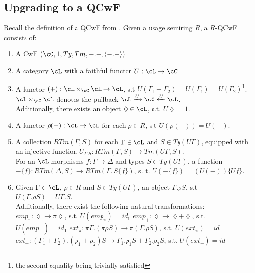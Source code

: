 \documentclass[12pt,a4paper]{article}
\begin{document}
\subsection*{Upgrading to a QCwF}
Recall the definition of a QCwF from \cite{Atkey2018}.
Given a usage semiring $R$, a $R$-QCwF consists of:
\begin{enumerate}[noitemsep]
  \item A CwF $(\cC, 1, Ty, Tm, -.-, \langle-.-\rangle)$
  
  \item A category $\cL$ with a faithful functor $U : \cL \to \cC$
  
  \item A functor $(+) : \cL \times_\cC \cL \to \cL$, s.t $U(\Gamma_1 + \Gamma_2) = U(\Gamma_1) = U(\Gamma_2)$\footnote{the second equality being trivially satisfied}. $\cL \times_\cC \cL$ denotes the pullback $\cL \xrightarrow{U} \cC \xleftarrow{U} \cL$.\\
  Additionally, there exists an object $\lozenge \in \cL$, s.t. $U\lozenge = 1$.
  
  \item A functor $\rho(-): \cL \to \cL$ for each $\rho \in R$, s.t $U(\rho(-)) = U(-)$.
  
  \item A collection $RTm(\Gamma, S)$ for each $\Gamma \in \cL$ and $S \in Ty(U\Gamma)$, equipped with an injective function $U_{\Gamma.S} : RTm(\Gamma, S) \to Tm(U\Gamma, S)$.\\
  For an $\cL$ morphisms $f: \Gamma \to \Delta$ and types $S \in Ty(U\Gamma)$, a function $-\{f\} : RTm(\Delta, S) \to RTm(\Gamma, S\{f\})$, s. t. $U(-\{f\}) = (U(-))\{Uf\}$.
         
  \item Given $\Gamma \in \cL$, $\rho \in R$ and $S \in Ty(U\Gamma)$, an object $\Gamma. \rho S$, s.t $U(\Gamma. \rho S) = U\Gamma.S$.\\
  Additionally, there exist the following natural transformations:
  \subitem $emp_\pi : \lozenge \to \pi\lozenge$, s.t. $U(emp_\pi)=id_1$
  \subitem $emp_+ : \lozenge \to \lozenge + \lozenge$, s.t. $U(emp_+)=id_1$
  \subitem $ext_\pi : \pi\Gamma. (\pi\rho S) \to \pi(\Gamma. \rho S)$, s.t. $U(ext_\pi) = id$ 
  \subitem $ext_+ : (\Gamma_1 + \Gamma_2).(\rho_1 + \rho_2)S \to \Gamma_1.\rho_1 S + \Gamma_2 . \rho_2 S$, s.t.  $U(ext_+) = id$ 
  

\end{enumerate}
\end{document}
